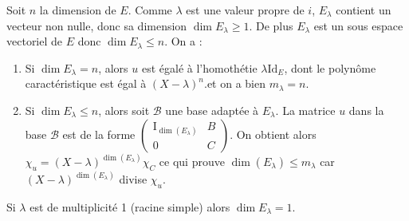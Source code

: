 \documentclass[a4paper]{book}
\begin{document}
\begin{Demonstration} 
Soit $n$ la dimension de  $E$. Comme $\lambda$  est une valeur propre de $i$, $E_\lambda$ contient un vecteur non nulle, donc sa dimension $\dim E_\lambda \geq 1$. De plus  $E_\lambda$ est un sous espace vectoriel de $E$ donc $\dim E_\lambda \leq n$. On a :
\begin{enumerate}
\item Si $\dim E_\lambda=n$, alors $u$ est égalé à l'homothétie $\lambda\mathrm{Id}_E$, dont le  polynôme caractéristique est égal à  $(X-\lambda)^n$.et on a bien $m_\lambda=n$.
\item Si $\dim E_\lambda\leq n$, alors soit $\mathcal{B}$ une base adaptée à  $E_\lambda$. La matrice $u$ dans la base $\mathcal{B}$ est de la forme $\begin{pmatrix}
\mathrm{I}_{\dim(E_\lambda)} & B \\ 0 & C
\end{pmatrix}$. On obtient alors $\chi_u = (X-\lambda)^{\dim(E_\lambda)} \chi_C$ ce qui prouve $\dim(E_\lambda)\leq m_\lambda$ car $(X-\lambda)^{\dim(E_\lambda)}$ divise  $\chi_u$. 
\end{enumerate}
\end{Demonstration}
\begin{Remarque}
Si $\lambda$ est de multiplicité 1 (racine simple) alors $\dim E_\lambda =1$.
\end{Remarque}
\end{document}
